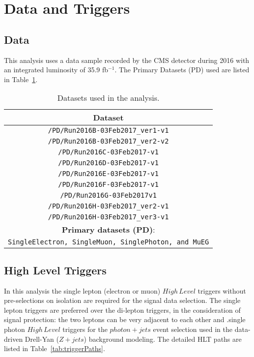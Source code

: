\section{Data and Triggers}
\subsection{Data}
This analysis uses a data sample recorded by the CMS detector during 2016 with an integrated luminosity of 35.9 fb$^{-1}$. The Primary Datasets (PD) used are listed in Table~\ref{tab:samples_data}. 
\begin{table}[htbp]
  \begin{center}
    \caption{Datasets used in the analysis. \label{tab:samples_data}}
    \begin{tabular}{c}
      \hline\hline
      Dataset   \\
      \hline
      \texttt{/PD/Run2016B-03Feb2017\_ver1-v1} \\ 
      \texttt{/PD/Run2016B-03Feb2017\_ver2-v2}  \\
      \texttt{/PD/Run2016C-03Feb2017-v1}  \\
      \texttt{/PD/Run2016D-03Feb2017-v1}  \\
      \texttt{/PD/Run2016E-03Feb2017-v1}  \\
      \texttt{/PD/Run2016F-03Feb2017-v1}  \\
      \texttt{/PD/Run2016G-03Feb2017v1}  \\
      \texttt{/PD/Run2016H-03Feb2017\_ver2-v1}  \\
      \texttt{/PD/Run2016H-03Feb2017\_ver3-v1}  \\
      \hline
      \textbf{Primary datasets (PD)}: \\
      \texttt{SingleElectron, SingleMuon, SinglePhoton, and MuEG}\\ \hline
      \hline\hline
    \end{tabular}
  \end{center}
\end{table}

\subsection{High Level Triggers}
In this analysis the single lepton (electron or muon) $High\,Level$ triggers without pre-selections on isolation are required for the signal data selection. The single lepton triggers are preferred over the di-lepton triggers, in the consideration of signal protection: the two leptons can be very adjacent to each other and .single photon $High\,Level$ triggers for the $photon+jets$ event selection used in the data-driven Drell-Yan ($Z+jets$) background modeling. The detailed HLT paths are listed in Table~\ref{tab:triggerPaths}. 

